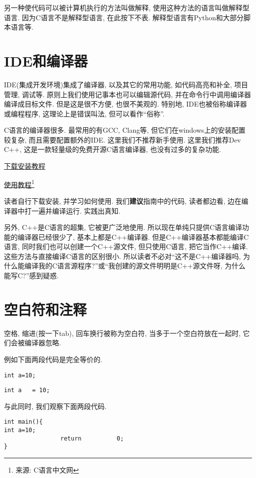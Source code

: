         另一种使代码可以被计算机执行的方法叫做解释, 使用这种方法的语言叫做解释型语言. 因为C语言不是解释型语言, 在此按下不表. 解释型语言有Python和大部分脚本语言等.

    \section{IDE和编译器} \label{编译器和IDE}
        IDE(集成开发环境)集成了编译器, 以及其它的常用功能, 如代码高亮和补全, 项目管理, 调试等. 原则上我们使用记事本也可以编辑源代码, 并在命令行中调用编译器编译成目标文件. 但是这是很不方便, 也很不美观的. 特别地, IDE也被俗称编译器或编程程序, 这理论上是错误叫法, 但可以看作``俗称''.

        C语言的编译器很多. 最常用的有GCC, Clang等, 但它们在windows上的安装配置较复杂, 而且需要配置额外的IDE. 这里我们不推荐新手使用. 这里我们推荐Dev C++, 这是一款轻量级的免费开源C语言编译器, 也没有过多的复杂功能.

        \href{http://c.biancheng.net/view/461.html}{下载安装教程}

        \href{http://c.biancheng.net/view/462.html}{使用教程}\footnote{来源: C语言中文网}

        读者自行下载安装, 并学习如何使用. 我们\textbf{建议}指南中的代码, 读者都边看, 边在编译器中打一遍并编译运行. 实践出真知.

        另外, C++是C语言的超集, 它被更广泛地使用. 所以现在单纯只提供C语言编译功能的编译器已经很少了, 基本上都是C++编译器. 但是C++编译器基本都能编译C语言, 同时我们也可以创建一个C++源文件, 但只使用C语言, 把它当作C++编译. 这些方法与直接编译C语言的区别很小. 所以读者不必对``这不是C++编译器吗, 为什么能编译我的C语言源程序?''或``我创建的源文件明明是C++源文件呀, 为什么能写C?''感到疑惑.

    \section{空白符和注释}
        空格, 缩进(按一下tab), 回车换行被称为空白符, 当多于一个空白符放在一起时, 它们会被编译器忽略.
        
        例如下面两段代码是完全等价的.
\begin{lstlisting}
int a=10;
\end{lstlisting}

\begin{lstlisting}
int a   = 10;
\end{lstlisting}
        
        与此同时, 我们观察下面两段代码.
\begin{lstlisting}
int main(){
int a=10;
                return          0;
}
\end{lstlisting}
            
